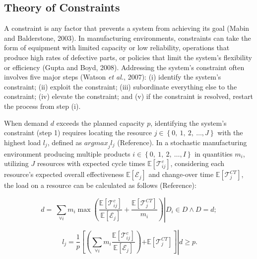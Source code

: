 \subsection{Theory of Constraints}\label{theory-of-constraints}

A constraint is any factor that prevents a system from achieving its
goal (Mabin and Balderstone, 2003). In manufacturing environments,
constraints can take the form of equipment with limited capacity or low
reliability, operations that produce high rates of defective parts, or
policies that limit the system's flexibility or efficiency (Gupta and
Boyd, 2008). Addressing the system's constraint often involves five
major steps (Watson \emph{et al.}, 2007): (i) identify the system's
constraint; (ii) exploit the constraint; (iii) subordinate everything
else to the constraint; (iv) elevate the constraint; and (v) if the
constraint is resolved, restart the process from step (i).

When demand \(d\) exceeds the planned capacity \(p\), identifying the
system's constraint (step 1) requires locating the resource
\(j \in \left\{ 0,\ 1,\ 2,\ \ldots,J \right\}\) with the highest load
\(l_{j}\), defined as \({argmax}_{j}l_{j}\) (\colorbox{yellow!40}{Reference}). In a
stochastic manufacturing environment producing multiple products
\(i \in \left\{ 0,\ 1,\ 2,\ \ldots,I \right\}\) in quantities \(m_{i}\),
utilizing \(J\) resources with expected cycle times
\(\mathbb{E}\left\lbrack \mathcal{T}_{ij}^{c} \right\rbrack\)\hspace{0pt},
considering each resource's expected overall effectiveness
\(\mathbb{E}\left\lbrack \mathcal{E}_{j} \right\rbrack\)\hspace{0pt}\hspace{0pt}
and change-over time
\(\mathbb{E}\left\lbrack \mathcal{T}_{j}^{CT} \right\rbrack\), the load
on a resource can be calculated as follows (\colorbox{yellow!40}{Reference}):

\begin{equation}
d = \left. \ \sum_{\forall i}^{}{m_{i}\max\left( \frac{\mathbb{E}\left\lbrack \mathcal{T}_{ij}^{c} \right\rbrack}{\mathbb{E}\left\lbrack \mathcal{E}_{j} \right\rbrack} + \frac{\mathbb{E}\left\lbrack \mathcal{T}_{j}^{CT} \right\rbrack}{m_{i}} \right)} \right|D_{i} \in D \land D = d;
\tag{8}
\end{equation}

\begin{equation}
\left. \ l_{j} = \frac{1}{p}\left\lbrack \left( \sum_{\forall i}^{}{m_{i}\frac{\mathbb{E}\left\lbrack \mathcal{T}_{ij}^{c} \right\rbrack}{\mathbb{E}\left\lbrack \mathcal{E}_{j} \right\rbrack}} \right)\mathbb{+ E}\left\lbrack \mathcal{T}_{j}^{CT} \right\rbrack \right\rbrack \right|d \geq p.
\tag{9}
\end{equation}

